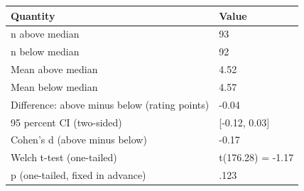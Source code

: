 \begin{table}[ht]
\centering
\begingroup\footnotesize
\begin{tabular}{ll}
  \toprule
Quantity & Value \\ 
  \midrule
n above median & 93 \\ 
  n below median & 92 \\ 
  Mean above median & 4.52 \\ 
  Mean below median & 4.57 \\ 
  Difference: above minus below (rating points) & -0.04 \\ 
  95 percent CI (two-sided) & [-0.12, 0.03] \\ 
  Cohen's d (above minus below) & -0.17 \\ 
  Welch t-test (one-tailed) & t(176.28) = -1.17 \\ 
  p (one-tailed, fixed in advance) & .123 \\ 
   \bottomrule
\end{tabular}
\endgroup
\end{table}

